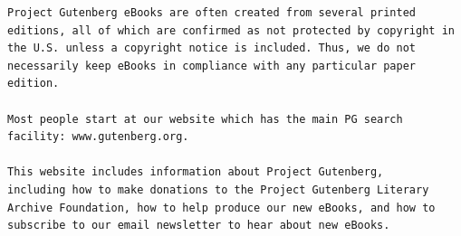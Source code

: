 \documentclass{article}
\begin{document}
\begin{verbatim}
Project Gutenberg eBooks are often created from several printed
editions, all of which are confirmed as not protected by copyright in
the U.S. unless a copyright notice is included. Thus, we do not
necessarily keep eBooks in compliance with any particular paper
edition.

Most people start at our website which has the main PG search
facility: www.gutenberg.org.

This website includes information about Project Gutenberg,
including how to make donations to the Project Gutenberg Literary
Archive Foundation, how to help produce our new eBooks, and how to
subscribe to our email newsletter to hear about new eBooks.



\end{verbatim}
\end{document}
